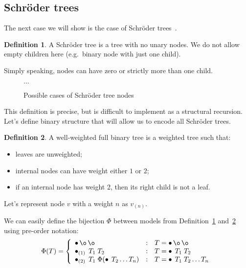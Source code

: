 \documentclass[final]{article}
\theoremstyle{definition}
\newtheorem{definition}{Definition}[subsection]
\theoremstyle{definition}
\theoremstyle{remark}
\newcommand{\weighted}[1]{\ensuremath{_{(#1)}}}
\DeclareMathOperator{\n}{\bullet}
\DeclareMathOperator{\no}{\o}
\begin{document}
\subsection{Schröder trees}%
\label{sub:schröder_trees}

The next case we will show is the case of Schröder trees~\cite{schroder}.

\begin{definition}
    \label{def:schroder_tree}
    A Schröder tree is a tree with no unary nodes. We do not allow empty children here (e.g.\ binary node with just one child).
\end{definition}

Simply speaking, nodes can have zero or strictly more than one child.

\begin{figure}[H]
    \centering
    
    
    
    
    \(\ldots\)
    \caption{Possible cases of Schröder tree nodes}
    \label{fig:schroder_trees}
\end{figure}

This definition is precise, but is difficult to implement as a structural recursion. Let's define binary structure that will allow us to encode all Schröder trees.

\begin{definition}
    \label{def:well_weighted}
    A well-weighted full binary tree is a weighted tree such that:
    \begin{itemize}
        \item leaves are unweighted;
        \item internal nodes can have weight either \(1\) or \(2\);
        \item if an internal node has weight 2, then its right child is not a leaf.
    \end{itemize}
\end{definition}

Let's represent node \(v\) with a weight \(n\) as \(v\weighted{n}\).

We can easily define the bijection \(\Phi\) between models from Definition~\ref{def:schroder_tree} and~\ref{def:well_weighted} using pre-order notation:
\[\Phi(T) = \left\{\begin{array}{lcl}
            \n \no \no &:& T = \n \no \no \\
            \n\weighted{1}\; T_1\; T_2 &:& T = \n\; T_1\; T_2\\
            \n\weighted{2}\; T_1\; \Phi(\n\; T_2 \ldots T_n) &:& T = \n\; T_1\; T_2 \ldots T_n
\end{array}\right.\]
\end{document}

